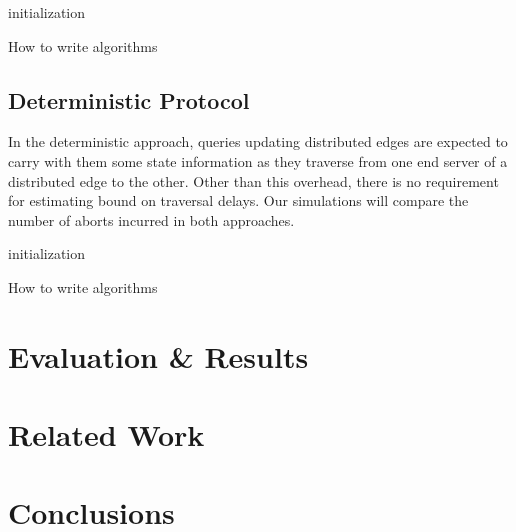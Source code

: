 \documentclass[sigplan,screen]{acmart}
\begin{document}
\begin{algorithm}
  \SetAlgoLined
{}
 initialization\;
 \caption{How to write algorithms}
\end{algorithm}

\subsection{Deterministic Protocol}

In the deterministic approach, queries updating distributed edges are expected to carry with them some state information as they traverse from one end server of a distributed edge to the other. Other than this overhead, there is no requirement for estimating bound on traversal delays. Our simulations will compare the number of aborts incurred in both approaches.

\begin{algorithm}
  \SetAlgoLined
{}
 initialization\;
 \caption{How to write algorithms}
\end{algorithm}

\section{Evaluation \& Results}

\section{Related Work}

\section{Conclusions}


\end{document}
